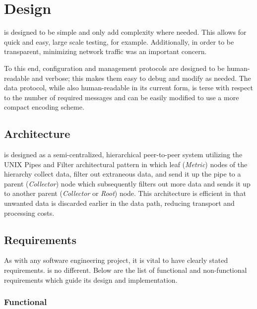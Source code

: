\chapter{Design}
\label{design}

\dcamp is designed to be simple and only add complexity where needed. This allows for quick and easy, large scale
testing, for example. Additionally, in order to be transparent, minimizing network traffic was an important concern.

To this end, \dcamp configuration and management protocols are designed to be human-readable and verbose; this makes
them easy to debug and modify as needed. The data protocol, while also human-readable in its current form, is terse with
respect to the number of required messages and can be easily modified to use a more compact encoding scheme.

\section{Architecture}

\dcamp is designed as a semi-centralized, hierarchical peer-to-peer system utilizing the UNIX Pipes and Filter
architectural pattern \cite{pipe-filter} in which leaf (\textit{Metric}) nodes of the hierarchy collect data, filter out
extraneous data, and send it up the pipe to a parent (\textit{Collector}) node which subsequently filters out more data
and sends it up to another parent (\textit{Collector} or \textit{Root}) node. This architecture is efficient in that
unwanted data is discarded earlier in the data path, reducing transport and processing costs.

\section{Requirements}

As with any software engineering project, it is vital to have clearly stated requirements. \dcamp is no different. Below
are the list of functional and non-functional requirements which guide its design and implementation.

\subsection{Functional}

